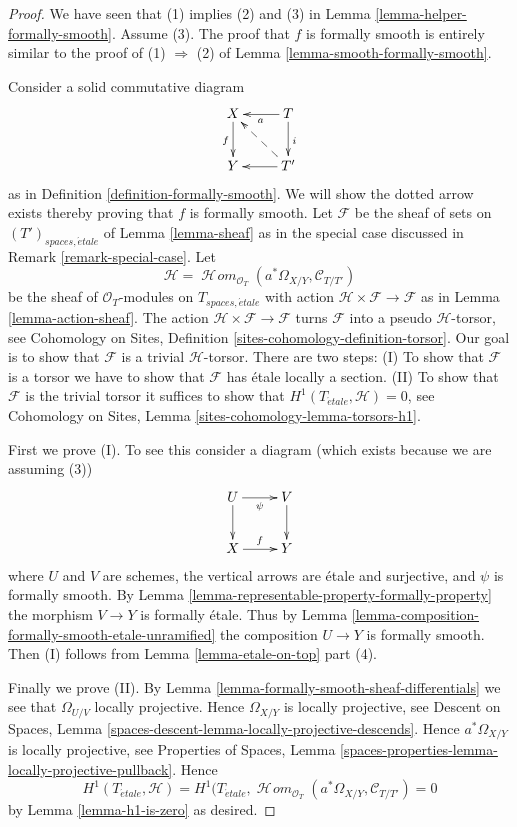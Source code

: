 \documentclass[10pt,a4paper]{amsart}
\theoremstyle{plain}
\theoremstyle{definition}
\theoremstyle{remark}
\numberwithin{equation}{subsection}
\def\SheafHom{\mathop{\mathcal{H}\!\mathit{om}}\nolimits}
\def\etale{{\acute{e}tale}}
\begin{document}
\begin{proof}
We have seen that (1) implies (2) and (3) in
Lemma \ref{lemma-helper-formally-smooth}.
Assume (3).
The proof that $f$ is formally smooth is entirely similar to
the proof of (1) $\Rightarrow$ (2) of
Lemma \ref{lemma-smooth-formally-smooth}.

\medskip\noindent
Consider a solid commutative diagram
$$
\xymatrix{
X \ar[d]_f & T \ar[d]^i \ar[l]^a \\
Y & T' \ar[l] \ar@{-->}[lu]
}
$$
as in Definition \ref{definition-formally-smooth}.
We will show the dotted arrow exists thereby
proving that $f$ is formally smooth.
Let $\mathcal{F}$ be the sheaf of sets on $(T')_{spaces, \etale}$ of
Lemma \ref{lemma-sheaf} as in the special case discussed in
Remark \ref{remark-special-case}.
Let
$$
\mathcal{H} =
\SheafHom_{\mathcal{O}_T}(a^*\Omega_{X/Y}, \mathcal{C}_{T/T'})
$$
be the sheaf of $\mathcal{O}_T$-modules on $T_{spaces, \etale}$
with action $\mathcal{H} \times \mathcal{F} \to \mathcal{F}$ as in
Lemma \ref{lemma-action-sheaf}.
The action $\mathcal{H} \times \mathcal{F} \to \mathcal{F}$
turns $\mathcal{F}$ into a pseudo $\mathcal{H}$-torsor, see
Cohomology on Sites, Definition \ref{sites-cohomology-definition-torsor}.
Our goal is to show that $\mathcal{F}$ is a trivial $\mathcal{H}$-torsor.
There are two steps: (I) To show that $\mathcal{F}$ is a torsor
we have to show that $\mathcal{F}$ has \'etale locally a
section. (II) To show that $\mathcal{F}$ is the trivial torsor
it suffices to show that $H^1(T_\etale, \mathcal{H}) = 0$, see
Cohomology on Sites, Lemma \ref{sites-cohomology-lemma-torsors-h1}.

\medskip\noindent
First we prove (I). To see this consider a diagram
(which exists because we are assuming (3))
$$
\xymatrix{
U \ar[d] \ar[r]_\psi & V \ar[d] \\
X \ar[r]^f & Y
}
$$
where $U$ and $V$ are schemes, the vertical arrows are \'etale and
surjective, and $\psi$ is formally smooth. By
Lemma \ref{lemma-representable-property-formally-property}
the morphism $V \to Y$ is formally \'etale. Thus by
Lemma \ref{lemma-composition-formally-smooth-etale-unramified}
the composition $U \to Y$ is formally smooth. Then (I) follows from
Lemma \ref{lemma-etale-on-top} part (4).

\medskip\noindent
Finally we prove (II). By
Lemma \ref{lemma-formally-smooth-sheaf-differentials}
we see that $\Omega_{U/V}$ locally projective.
Hence $\Omega_{X/Y}$ is locally projective, see
Descent on Spaces,
Lemma \ref{spaces-descent-lemma-locally-projective-descends}.
Hence $a^*\Omega_{X/Y}$ is locally projective, see
Properties of Spaces, Lemma
\ref{spaces-properties-lemma-locally-projective-pullback}.
Hence
$$
H^1(T_\etale, \mathcal{H}) =
H^1(T_\etale,
\SheafHom_{\mathcal{O}_T}(a^*\Omega_{X/Y}, \mathcal{C}_{T/T'}) = 0
$$
by
Lemma \ref{lemma-h1-is-zero}
as desired.
\end{proof}
\end{document}
